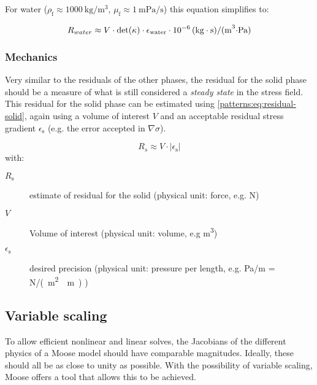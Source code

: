 \vspace{1em}

For water ($\rho_\mathrm{f} \approx \qty[per-mode =
        symbol]{1000}{\kilogram\per\cubic\metre}$, $\mu_\mathrm{f} \approx
    \qty[per-mode = symbol]{1}{\milli\pascal\per\second}$) this equation simplifies
to:

\begin{equation}
    R_{water} \approx V \cdot \det (\kappa) \cdot \epsilon_\mathrm{water} \cdot \SI{E-6}{(\kilogram\cdot\second)\per(\cubic\metre\cdot\pascal)}
\end{equation}

\subsubsection{Mechanics}

Very similar to the residuals of the other phases, the residual for the solid
phase should be a measure of what is still considered a \emph{steady state} in
the stress field. This residual for the solid phase can be estimated using
\autoref{patterns:eq:residual-solid}, again using a volume of interest $V$ and
an acceptable residual stress gradient $\epsilon_\mathrm{s}$ (e.g. the error
accepted in $\nabla \sigma$).

\begin{equation}
    \label{patterns:eq:residual-solid}
    R_{s} \approx V \cdot \left|\epsilon_\mathrm{s}\right|
\end{equation}
with:
\begin{description}
    \item[$R_\mathrm{s}$] estimate of residual for the solid (physical unit: force, e.g. \unit{\newton})
    \item[$V$] Volume of interest (physical unit: volume, e.g \unit{\cubic\metre})
    \item[$\epsilon_\mathrm{s}$] desired precision (physical unit: pressure per length, e.g. \unit[per-mode = symbol]{\pascal\per\metre} = \unit[per-mode = symbol]{\newton\per(\square\metre\cdot\metre)} )
\end{description}

\subsection{Variable scaling}

To allow efficient nonlinear and linear solves, the Jacobians of the different
physics of a Moose model should have comparable magnitudes. Ideally, these
should all be as close to unity as possible. With the possibility of variable
scaling, Moose offers a tool that allows this to be achieved.

